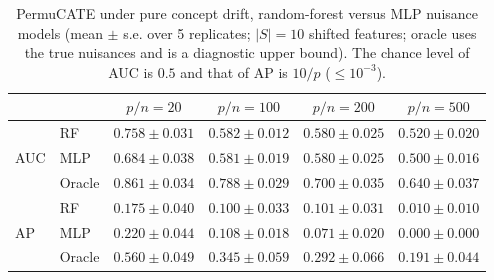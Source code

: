 \begin{table}[t]
\centering
\caption{PermuCATE under pure concept drift, random-forest versus MLP nuisance models (mean $\pm$ s.e. over 5 replicates; $|S| = 10$ shifted features; oracle uses the true nuisances and is a diagnostic upper bound). The chance level of AUC is $0.5$ and that of AP is $10/p$ ($\leq 10^{-3}$).}
\label{tab:uhd_mlp}
\begin{tabular}{llcccc}
\toprule
 & & $p/n=20$ & $p/n=100$ & $p/n=200$ & $p/n=500$ \\
\midrule
\multirow{3}{*}{AUC}
 & RF  & $0.758 \pm 0.031$ & $0.582 \pm 0.012$ & $0.580 \pm 0.025$ & $0.520 \pm 0.020$ \\
 & MLP & $0.684 \pm 0.038$ & $0.581 \pm 0.019$ & $0.580 \pm 0.025$ & $0.500 \pm 0.016$ \\
 & Oracle & $0.861 \pm 0.034$ & $0.788 \pm 0.029$ & $0.700 \pm 0.035$ & $0.640 \pm 0.037$ \\
\midrule
\multirow{3}{*}{AP}
 & RF  & $0.175 \pm 0.040$ & $0.100 \pm 0.033$ & $0.101 \pm 0.031$ & $0.010 \pm 0.010$ \\
 & MLP & $0.220 \pm 0.044$ & $0.108 \pm 0.018$ & $0.071 \pm 0.020$ & $0.000 \pm 0.000$ \\
 & Oracle & $0.560 \pm 0.049$ & $0.345 \pm 0.059$ & $0.292 \pm 0.066$ & $0.191 \pm 0.044$ \\
\bottomrule
\end{tabular}
\end{table}

